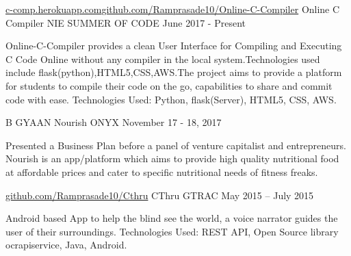 \begin{cventries}
  \cventry
    {\href{https://c-comp.herokuapp.com}{c-comp.herokuapp.com}\quad\textbar\quad \href{https://github.com/Ramprasade10/Online-C-Compiler}{github.com/Ramprasade10/Online-C-Compiler}}
    {Online C Compiler} %
    {NIE SUMMER OF CODE} %
    {June 2017 - Present} %
    {
      \begin{cvitems} %
        \item {Online-C-Compiler provides a clean User Interface for Compiling and Executing C Code Online without any compiler in the local system.Technologies used include flask(python),HTML5,CSS,AWS.The project aims to provide a platform for students to compile their code on the go, capabilities to share and commit code with ease.\newline{}
Technologies Used: Python, flask(Server), HTML5, CSS, AWS.}
      \end{cvitems}
    }

  \cventry
    {B GYAAN} %
    {Nourish} %
    {ONYX} %
    {November 17 - 18, 2017} %
    {
      \begin{cvitems} %
        \item {Presented a Business Plan before a panel of venture capitalist and entrepreneurs.
Nourish is an app/platform which aims to provide high quality nutritional food at affordable prices and cater to specific nutritional needs of fitness freaks.}
      \end{cvitems}
    }
  \cventry
    {\href{https://github.com/Ramprasade10/Cthru}{github.com/Ramprasade10/Cthru}} %
    {CThru} %
    {GTRAC} %
    {May 2015 – July 2015} %
    {
      \begin{cvitems} %
        \item {Android based App to help the blind see the world, a voice narrator guides the user of their surroundings.\newline{}
Technologies Used: REST API, Open Source library ocrapiservice, Java, Android.}
      \end{cvitems}
    }


\end{cventries}
